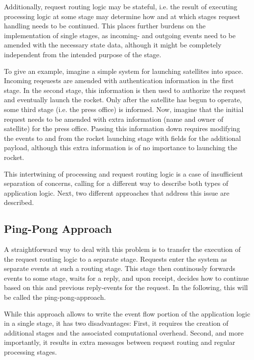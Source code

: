 \documentclass{sig-alternate}
\begin{document}
Additionally, request routing logic may be stateful, i.e. the result of executing processing logic
at some stage may determine how and at which stages request handling needs to be continued. This
places further burdens on the implementation of single stages, as incoming- and outgoing events need
to be amended with the necessary state data, although it might be completely independent from the
intended purpose of the stage.

To give an example, imagine a simple system for launching satellites into space. Incoming
reqeuests are amended with authentication information in the first stage. In the second stage, this
information is then used to authorize the request and eventually launch the rocket. Only after the
satellite has begun to operate, some third stage (i.e. the press office) is informed.  Now, imagine
that the initial request needs to be amended with extra information (name and owner of satellite)
for the press office.  Passing this information down requires modifying the events to and from
the rocket launching stage with fields for the additional payload, although this extra information
is of no importance to launching the rocket.

This intertwining of processing and request routing logic is a case of insufficient separation of
concerns, calling for a different way to describe both types of application logic.  Next, two 
different approaches that address this issue are described.


\subsection{Ping-Pong Approach}

A straightforward way to deal with this problem is to transfer the execution of the request routing
logic to a separate stage. Requests enter the system as separate events at such a routing stage.
This stage then continously forwards events to some stage, waits for a reply, and upon receipt,
decides how to continue based on this and previous reply-events for the request. In the following,
this will be called the ping-pong-approach.

While this approach allows to write the event flow portion of the application logic in a single
stage, it has two disadvantages: First, it requires the creation of additional stages and the
associated computational overhead. Second, and more importantly, it results in extra messages
between request routing and regular processing stages.
\end{document}
